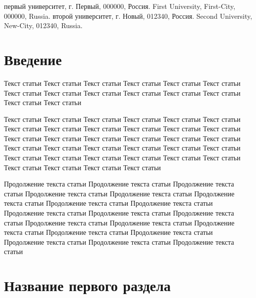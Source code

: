				{первый университет, г. Первый, 000000, Россия.}%
				{First University, First-City, 000000, Russia.}%
				{второй университет, г. Новый, 012340, Россия.} %
				{Second University,  New-City, 012340, Russia.} %


\newcommand{\pX}{{\mathcal X}}
\let\msf=\mathsf
\newcommand{\var}{\mathop{\sf Var}}



	\Header
	\captionsenglish
	\SubHeader
	\captionsrussian

\section*{Введение}

Текст статьи Текст статьи Текст статьи Текст статьи Текст статьи Текст статьи Текст статьи Текст статьи Текст статьи Текст статьи Текст статьи Текст статьи Текст статьи Текст статьи 

Текст статьи Текст статьи Текст статьи Текст статьи Текст статьи Текст статьи Текст статьи Текст статьи Текст статьи Текст статьи Текст статьи Текст статьи Текст статьи Текст статьи Текст статьи Текст статьи Текст статьи Текст статьи Текст статьи Текст статьи Текст статьи Текст статьи Текст статьи Текст статьи Текст статьи Текст статьи Текст статьи Текст статьи Текст статьи Текст статьи Текст статьи Текст статьи Текст статьи Текст статьи 

Продолжение текста статьи Продолжение текста статьи Продолжение текста статьи Продолжение текста статьи Продолжение текста статьи Продолжение текста статьи Продолжение текста статьи Продолжение текста статьи Продолжение текста статьи Продолжение текста статьи Продолжение текста статьи Продолжение текста статьи Продолжение текста статьи Продолжение текста статьи Продолжение текста статьи Продолжение текста статьи Продолжение текста статьи Продолжение текста статьи Продолжение текста статьи 

\section{Название первого раздела}


